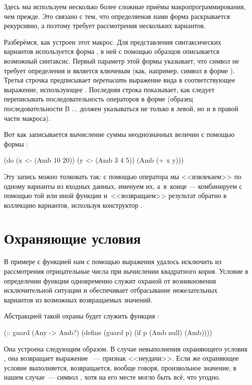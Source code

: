 Здесь мы используем несколько более сложные приёмы макропрограммирования, чем прежде. Это связано с тем, что определяемая нами форма раскрывается рекурсивно, а поэтому требует рассмотрения нескольких вариантов. 

Разберёмся, как устроен этот макрос. Для представления синтаксических вариантов используется форма , в ней с помощью образцов описывается возможный синтаксис. Первый параметр этой формы \s{(<-)} указывает, что символ \s{<-} не требует определения и является ключевым (как, например, символ  в форме ).
Третья строчка предписывает \emph{переписать} выражение вида  в соответствующее выражение, использующее . Последняя строка показывает, как следует переписывать последовательность операторов в форме  (образец последовательности {\schemestyle B ...} должен указываться не только в левой, но и в правой части макроса).

Вот как записывается вычисление суммы неоднозначных величин с помощью формы :
\begin{SchemeCode}
(do (x <- (Amb 10 20))
    (y <- (Amb 3 4 5)) 
    (Amb (+ x y)))
\end{SchemeCode}

Эту запись можно толковать так: с помощью оператора \s{<-} мы <<извлекаем>> по одному варианты из входных данных, именуем их, а~в~конце --- комбинируем с помощью той или иной функции и~<<возвращаем>> результат обратно в коллекцию вариантов, используя конструктор .

\section[2]{Охраняющие условия}%
В примере с функцией  нам с помощью выражения  удалось исключить из рассмотрения отрицательные числа при вычислении квадратного корня. Условие в определении функции  одновременно служит охраной от возникновения исключительной ситуации и обеспечивает отбрасывание нежелательных вариантов из возможных возвращаемых значений.

Абстракцией такой охраны будет служить функция :

\begin{Definition}[emph={p}]
(:: guard (Any -> Amb?)
  (define (guard p)
    (if p (Amb null) (Amb))))
\end{Definition}

Она устроена следующим образом. В случае невыполнения охраняющего условия , она возвращает  выражение ~--- признак <<неудачи>>. Если же охраняющее условие выполняется, возвращается, вообще говоря, произвольное значение, в нашем случае~--- символ , хотя на его месте могло быть всё, что угодно.

